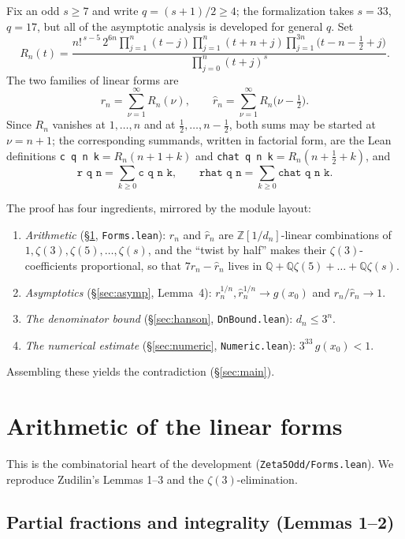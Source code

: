 \documentclass[11pt]{article}
\theoremstyle{definition}
\newcommand{\Z}{\mathbb{Z}}
\newcommand{\Q}{\mathbb{Q}}
\newcommand{\code}[1]{\texttt{#1}}
\newcommand{\Rn}{R_n}
\begin{document}
Fix an odd $s\ge7$ and write $q=(s+1)/2\ge4$; the formalization takes $s=33$,
$q=17$, but all of the asymptotic analysis is developed for general $q$. Set
\begin{equation}\label{eq:R}
  \Rn(t)=
  \frac{n!^{\,s-5}\,2^{6n}\prod_{j=1}^{n}(t-j)\prod_{j=1}^{n}(t+n+j)
        \prod_{j=1}^{3n}\!\bigl(t-n-\tfrac12+j\bigr)}
       {\prod_{j=0}^{n}(t+j)^{s}} .
\end{equation}
The two families of linear forms are
\[
  r_n=\sum_{\nu=1}^{\infty}\Rn(\nu),\qquad
  \hat r_n=\sum_{\nu=1}^{\infty}\Rn\!\bigl(\nu-\tfrac12\bigr).
\]
Since $\Rn$ vanishes at $1,\dots,n$ and at $\tfrac12,\dots,n-\tfrac12$, both
sums may be started at $\nu=n+1$; the corresponding summands, written in
factorial form, are the Lean definitions \code{c q n k}$=\Rn(n+1+k)$ and
\code{chat q n k}$=\Rn(n+\tfrac12+k)$, and
\[
  \code{r q n}=\sum_{k\ge0}\code{c q n k},\qquad
  \code{rhat q n}=\sum_{k\ge0}\code{chat q n k}.
\]

The proof has four ingredients, mirrored by the module layout:
\begin{enumerate}[label=(\Alph*)]
\item \emph{Arithmetic} (\S\ref{sec:arith}, \code{Forms.lean}): $r_n$ and
  $\hat r_n$ are $\Z[1/d_n]$-linear combinations of $1,\zeta(3),\zeta(5),\dots,
  \zeta(s)$, and the ``twist by half'' makes their $\zeta(3)$-coefficients
  proportional, so that $7r_n-\hat r_n$ lives in
  $\Q+\Q\zeta(5)+\dots+\Q\zeta(s)$.
\item \emph{Asymptotics} (\S\ref{sec:asymp}, Lemma~4): $r_n^{1/n},\hat
  r_n^{1/n}\to g(x_0)$ and $r_n/\hat r_n\to1$.
\item \emph{The denominator bound} (\S\ref{sec:hanson}, \code{DnBound.lean}):
  $d_n\le 3^n$.
\item \emph{The numerical estimate} (\S\ref{sec:numeric},
  \code{Numeric.lean}): $3^{33}\,g(x_0)<1$.
\end{enumerate}
Assembling these yields the contradiction (\S\ref{sec:main}).

\section{Arithmetic of the linear forms}\label{sec:arith}

This is the combinatorial heart of the development
(\code{Zeta5Odd/Forms.lean}). We reproduce Zudilin's Lemmas 1--3 and the
$\zeta(3)$-elimination.

\subsection{Partial fractions and integrality (Lemmas 1--2)}
\end{document}

